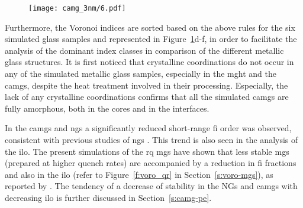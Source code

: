 \begin{changebar}
\begin{figure}[!ht]
\centering
\texttt{[image: camg\_3nm/6.pdf]}
\label{f:voro_camg}
\end{figure}

Furthermore, the Voronoi indices are sorted based on the above rules for the six simulated glass samples and represented in Figure~\ref{f:voro_camg}d-f, in order to facilitate the analysis of the dominant index classes in comparison of the different metallic glass structures. It is first noticed that crystalline coordinations do not occur in any of the simulated metallic glass samples, especially in the \gls{mght} and the \gls{camg}s, despite the heat treatment involved in their processing. Especially, the lack of any crystalline coordinations confirms that all the simulated \gls{camg}s are fully amorphous, both in the cores and in the interfaces. \par

In the \gls{camg}s and \gls{ng}s a significantly reduced short-range \gls{fi} order was observed, consistent with previous studies of \gls{ng}s \cite{Adjaoud2019}. This trend is also seen in the analysis of the \gls{ilo}. The present simulations of the \gls{rq} \cz \gls{mg}s have shown that less stable \gls{mg}s (prepared at higher quench rates) are accompanied by a reduction in \gls{fi} fractions and also in the \gls{ilo} (refer to Figure~\ref{f:voro_qr} in Section~\ref{s:voro-mgs}), as reported by \textcite{Yue2018}. The tendency of a decrease of stability in the NGs and \gls{camg}s with decreasing \gls{ilo} is further discussed in Section~\ref{s:camg-pe}. \par
\end{changebar}


